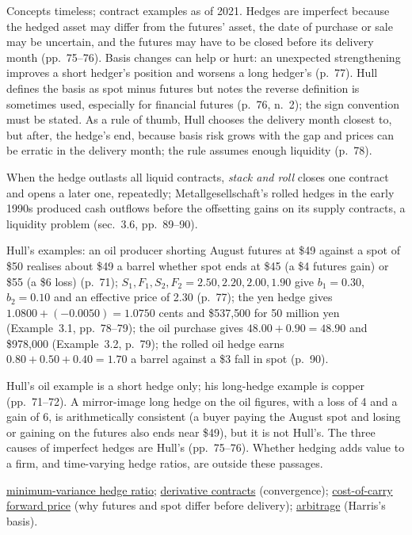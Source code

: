 \begin{qfdefinition}
 Concepts timeless; contract examples as of 2021. Hedges are imperfect because the hedged asset may differ from the futures' asset, the date of purchase or sale may be uncertain, and the futures may have to be closed before its delivery month (pp.~75--76). Basis changes can help or hurt: an unexpected strengthening improves a short hedger's position and worsens a long hedger's (p.~77). Hull defines the basis as spot minus futures but notes the reverse definition is sometimes used, especially for financial futures (p.~76, n.~2); the sign convention must be stated. As a rule of thumb, Hull chooses the delivery month closest to, but after, the hedge's end, because basis risk grows with the gap and prices can be erratic in the delivery month; the rule assumes enough liquidity (p.~78).

When the hedge outlasts all liquid contracts, \emph{stack and roll} closes one contract and opens a later one, repeatedly; Metallgesellschaft's rolled hedges in the early 1990s produced cash outflows before the offsetting gains on its supply contracts, a liquidity problem (sec.~3.6, pp.~89--90).

 Hull's examples: an oil producer shorting August futures at \$49 against a spot of \$50 realises about \$49 a barrel whether spot ends at \$45 (a \$4 futures gain) or \$55 (a \$6 loss) (p.~71); $S_1,F_1,S_2,F_2=2.50,2.20,2.00,1.90$ give $b_1=0.30$, $b_2=0.10$ and an effective price of 2.30 (p.~77); the yen hedge gives $1.0800+(-0.0050)=1.0750$ cents and \$537{,}500 for 50 million yen (Example~3.1, pp.~78--79); the oil purchase gives $48.00+0.90=48.90$ and \$978{,}000 (Example~3.2, p.~79); the rolled oil hedge earns $0.80+0.50+0.40=1.70$ a barrel against a \$3 fall in spot (p.~90).

 Hull's oil example is a short hedge only; his long-hedge example is copper (pp.~71--72). A mirror-image long hedge on the oil figures, with a loss of 4 and a gain of 6, is arithmetically consistent (a buyer paying the August spot and losing or gaining on the futures also ends near \$49), but it is not Hull's. The three causes of imperfect hedges are Hull's (pp.~75--76). Whether hedging adds value to a firm, and time-varying hedge ratios, are outside these passages.

 \hyperref[mod:minimum-variance-hedge-ratio]{minimum-variance hedge ratio}; \hyperref[def:derivative-contracts]{derivative contracts} (convergence); \hyperref[res:cost-of-carry-forward-price]{cost-of-carry forward price} (why futures and spot differ before delivery); \hyperref[def:arbitrage]{arbitrage} (Harris's basis).


\end{qfdefinition}
